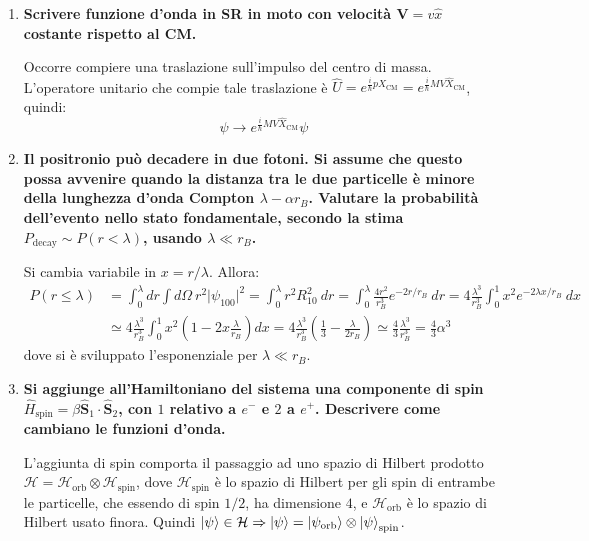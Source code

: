 \documentclass[11pt, a4paper]{scrartcl} %
\numberwithin{equation}{subsection}
\theoremstyle{style2}
\theoremstyle{style1}
\begin{document}
\begin{enumerate}[(1).]
Per gli stati $\ket{2 , 1 , m} $, invece, per il fatto che l'integrale del raggio quadratico medio coinvolge una grandezza indipendente da $m$, il risultato \`e analogo per tutti gli stati al variare di $m = -1,0,1$. Ripetendo un calcolo analogo, si trova $\langle r^2 \rangle_{21}  = 30 r_B^2$.
\item \textbf{Scrivere funzione d'onda in SR in moto con velocit\`a $\mathbf{V} = v \hat{x}$ costante rispetto al CM.} 

Occorre compiere una traslazione sull'impulso del centro di massa. L'operatore unitario che compie tale traslazione \`e $\hat{U} = e^{\frac{i}{\hbar }p \hat{X}_\text{CM}} = e^{\frac{i}{\hbar } MV \hat{X}_\text{CM}} $, quindi:
\begin{equation}
	\psi  \to e^{\frac{i}{\hbar } MV \hat{X}_\text{CM}} \psi 
\end{equation}
\item \textbf{Il positronio pu\`o decadere in due fotoni. Si assume che questo possa avvenire quando la distanza tra le due particelle \`e minore della lunghezza d'onda Compton $\lambda  - \alpha  r_B$. Valutare la probabilit\`a dell'evento nello stato fondamentale, secondo la stima $P_\text{decay}\sim P(r<\lambda )$, usando $\lambda \ll r_B$.} 

	Si cambia variabile in $x = r / \lambda $. Allora:
	\[
	\begin{split}
		P(r\le \lambda ) &= \int_{0} ^\lambda dr \int d\Omega  \ r^2 \lvert \psi _{100}  \rvert ^2 = \int_{0} ^\lambda r^2 R_{10} ^2 \ dr = \int_{0} ^\lambda \frac{4r^2}{r_B^3} e^{- 2 r / r_B} \ dr = 4 \frac{\lambda ^3}{r_B^3}\int_{0} ^1 x^2 e ^{-2\lambda  x / r_B}  \ dx\\
				 &\simeq 4 \frac{\lambda ^3}{r_B^3} \int_{0} ^1 x^2 \left(1-2x \frac{\lambda}{r_B}\right)  dx= 4 \frac{\lambda ^3}{r_B^3} \left(\frac{1}{3}-\frac{\lambda }{2r_B}\right) \simeq \frac{4}{3}\frac{\lambda ^3}{r_B^3} = \frac{4}{3}\alpha ^3
	\end{split}
	\] 
dove si \`e sviluppato l'esponenziale per $\lambda \ll r_B$.

\item \textbf{Si aggiunge all'Hamiltoniano del sistema una componente di spin $\hat{H}_\text{spin}= \beta  \hat{\mathbf{S} }_1 \cdot \hat{\mathbf{S} }_2$, con $1$ relativo a $e^-$ e $2$ a $e^+$. Descrivere come cambiano le funzioni d'onda.}

	L'aggiunta di spin comporta il passaggio ad uno spazio di Hilbert prodotto $\mathcal{H} = \mathcal{H}_\text{orb} \otimes \mathcal{H}_\text{spin}$, dove $\mathcal{H}_\text{spin}$ \`e lo spazio di Hilbert per gli spin di entrambe le particelle, che essendo di spin $1 / 2$, ha dimensione $4$, e $\mathcal{H}_\text{orb}$ \`e lo spazio di Hilbert usato finora.
Quindi $\ket{\psi } \in \mathcal{H}\Rightarrow \ket{\psi } = \ket{\psi _\text{orb}} \otimes \ket{\psi } _\text{spin}$.


\end{enumerate}
\end{document}
